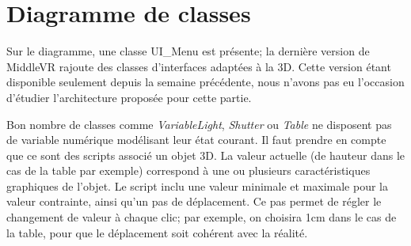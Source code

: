 \section{Diagramme de classes}

Sur le diagramme, une classe UI_Menu est présente; la dernière version de MiddleVR rajoute des classes d'interfaces adaptées à la 3D.
Cette version étant disponible seulement depuis la semaine précédente, nous n'avons pas eu l'occasion d'étudier l'architecture proposée pour cette partie.

Bon nombre de classes comme \textit{VariableLight}, \textit{Shutter} ou \textit{Table} ne disposent pas de variable numérique modélisant leur état courant.
Il faut prendre en compte que ce sont des scripts associé un objet 3D. La valeur actuelle (de hauteur dans le cas de la table par exemple) correspond à une ou plusieurs caractéristiques graphiques de l'objet.
Le script inclu une valeur minimale et maximale pour la valeur contrainte, ainsi qu'un pas de déplacement.
 Ce pas permet de régler le changement de valeur à chaque clic; par exemple, on choisira 1cm dans le cas de la table, pour que le déplacement soit cohérent avec la réalité.
 
 
 